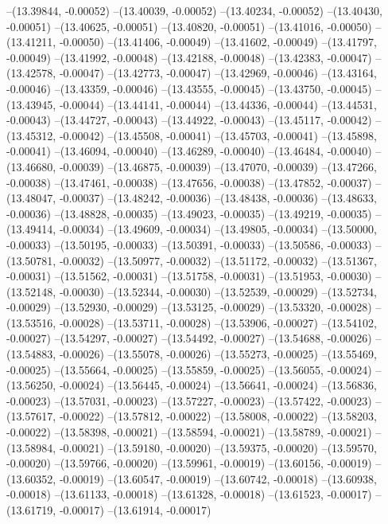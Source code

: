 --(13.39844, -0.00052)
--(13.40039, -0.00052)
--(13.40234, -0.00052)
--(13.40430, -0.00051)
--(13.40625, -0.00051)
--(13.40820, -0.00051)
--(13.41016, -0.00050)
--(13.41211, -0.00050)
--(13.41406, -0.00049)
--(13.41602, -0.00049)
--(13.41797, -0.00049)
--(13.41992, -0.00048)
--(13.42188, -0.00048)
--(13.42383, -0.00047)
--(13.42578, -0.00047)
--(13.42773, -0.00047)
--(13.42969, -0.00046)
--(13.43164, -0.00046)
--(13.43359, -0.00046)
--(13.43555, -0.00045)
--(13.43750, -0.00045)
--(13.43945, -0.00044)
--(13.44141, -0.00044)
--(13.44336, -0.00044)
--(13.44531, -0.00043)
--(13.44727, -0.00043)
--(13.44922, -0.00043)
--(13.45117, -0.00042)
--(13.45312, -0.00042)
--(13.45508, -0.00041)
--(13.45703, -0.00041)
--(13.45898, -0.00041)
--(13.46094, -0.00040)
--(13.46289, -0.00040)
--(13.46484, -0.00040)
--(13.46680, -0.00039)
--(13.46875, -0.00039)
--(13.47070, -0.00039)
--(13.47266, -0.00038)
--(13.47461, -0.00038)
--(13.47656, -0.00038)
--(13.47852, -0.00037)
--(13.48047, -0.00037)
--(13.48242, -0.00036)
--(13.48438, -0.00036)
--(13.48633, -0.00036)
--(13.48828, -0.00035)
--(13.49023, -0.00035)
--(13.49219, -0.00035)
--(13.49414, -0.00034)
--(13.49609, -0.00034)
--(13.49805, -0.00034)
--(13.50000, -0.00033)
--(13.50195, -0.00033)
--(13.50391, -0.00033)
--(13.50586, -0.00033)
--(13.50781, -0.00032)
--(13.50977, -0.00032)
--(13.51172, -0.00032)
--(13.51367, -0.00031)
--(13.51562, -0.00031)
--(13.51758, -0.00031)
--(13.51953, -0.00030)
--(13.52148, -0.00030)
--(13.52344, -0.00030)
--(13.52539, -0.00029)
--(13.52734, -0.00029)
--(13.52930, -0.00029)
--(13.53125, -0.00029)
--(13.53320, -0.00028)
--(13.53516, -0.00028)
--(13.53711, -0.00028)
--(13.53906, -0.00027)
--(13.54102, -0.00027)
--(13.54297, -0.00027)
--(13.54492, -0.00027)
--(13.54688, -0.00026)
--(13.54883, -0.00026)
--(13.55078, -0.00026)
--(13.55273, -0.00025)
--(13.55469, -0.00025)
--(13.55664, -0.00025)
--(13.55859, -0.00025)
--(13.56055, -0.00024)
--(13.56250, -0.00024)
--(13.56445, -0.00024)
--(13.56641, -0.00024)
--(13.56836, -0.00023)
--(13.57031, -0.00023)
--(13.57227, -0.00023)
--(13.57422, -0.00023)
--(13.57617, -0.00022)
--(13.57812, -0.00022)
--(13.58008, -0.00022)
--(13.58203, -0.00022)
--(13.58398, -0.00021)
--(13.58594, -0.00021)
--(13.58789, -0.00021)
--(13.58984, -0.00021)
--(13.59180, -0.00020)
--(13.59375, -0.00020)
--(13.59570, -0.00020)
--(13.59766, -0.00020)
--(13.59961, -0.00019)
--(13.60156, -0.00019)
--(13.60352, -0.00019)
--(13.60547, -0.00019)
--(13.60742, -0.00018)
--(13.60938, -0.00018)
--(13.61133, -0.00018)
--(13.61328, -0.00018)
--(13.61523, -0.00017)
--(13.61719, -0.00017)
--(13.61914, -0.00017)
